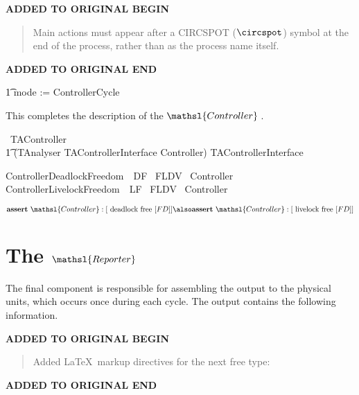 \documentclass{report}
\renewcommand{\freetype}[1]{\mathsf{#1}}
\newcommand{\freetypecloseValve}{\freetype{closeValve}}
\newcommand{\freetypeinitialisation}{\freetype{initialisation}}
\newcommand{\freetypelevelFailureDetection}{\freetype{levelFailureDetection}}
\newcommand{\freetypelevelRepairedAcknowledgement}%
  {\freetype{levelRepairedAcknowledgement}}
\newcommand{\freetypeopenValve}{\freetype{openValve}}
\newcommand{\freetypeprogramReady}{\freetype{programReady}}
\newcommand{\freetypesteamFailureDetection}{\freetype{steamFailureDetection}}
\newcommand{\freetypesteamRepairedAcknowledgement}%
  {\freetype{steamRepairedAcknowledgement}}
\newenvironment{addedstuff}{\begin{flushleft}\textbf{ADDED TO ORIGINAL BEGIN}\begin{quote}\begin{minipage}{.8\textwidth}}{\end{minipage}\end{quote}\textbf{ADDED TO ORIGINAL END}\end{flushleft}}
\begin{document}
\begin{addedstuff}
   Main actions must appear after a CIRCSPOT ($\circspot$) symbol at the end of the process,
   rather than as the process name itself.
\end{addedstuff}

\begin{circusaction}
   \t1 \circspot mode := \freetypeinitialisation \circseq ControllerCycle \\
\end{circusaction}

This completes the description of the \( \mathsl{Controller} \, \).

\begin{circus}
   \circend
\end{circus}

\begin{circus}
   \circprocess\ TAController \circdef \\
    \t1 (TAnalyser \lpar TAControllerInterface \rpar Controller) \circhide TAControllerInterface
\end{circus}

\begin{circus}
   ControllerDeadlockFreedom\ \circassertref\ DF \circrefines\ FLDV~ Controller \\
   ControllerLivelockFreedom\ \circassertref\ LF \circrefines\ FLDV~ Controller \\
\end{circus}
\[
  \mathbf{assert}\ \mathsl{Controller} :[ \hbox{ deadlock free } [FD] ] %
  \also %
  \mathbf{assert}\ \mathsl{Controller} :[ \hbox{ livelock free } [FD] ]
\]


\chapter{The $\mathsl{Reporter}$}

The final component is responsible for assembling the output to the
physical units, which occurs once during each cycle.  The output
contains the following information.

\begin{addedstuff}
Added \LaTeX\ markup directives for the next free type:
\end{addedstuff}
\end{document}
